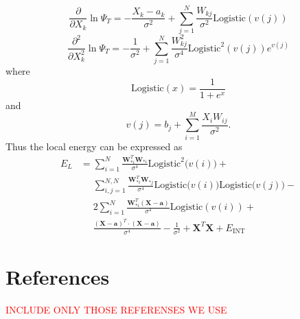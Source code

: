 \documentclass[norsk,a4paper,12pt]{article}
\begin{document}
\begin{equation}
\frac{\partial}{\partial X_k}\ln\Psi_T=-\frac{X_k-a_k}{\sigma^2}+\sum_{j=1}^{N}\frac{W_{kj}}{\sigma^2}\text{Logistic}(v(j))
\end{equation}
\begin{equation}
\frac{\partial^2}{\partial X_k^2}\ln\Psi_T=-\frac{1}{\sigma^2}+\sum_{j=1}^{N}\frac{W_{kj}^2}{\sigma^4}\text{Logistic}^2(v(j))e^{v(j)}
\end{equation}
where 
\begin{equation}
\text{Logistic}(x)=\frac{1}{1+e^x}
\end{equation}
and
\begin{equation}
v(j)=b_j+\sum_{i=1}^{M}\frac{X_iW_{ij}}{\sigma^2}.
\end{equation}
Thus the local energy can be expressed as
\begin{align}
E_L&=\sum_{i=1}^{N}\frac{\boldsymbol{W}_{*i}^T\boldsymbol{W}_{*i}}{\sigma^4}\text{Logistic}^2\big(v(i)\big)+\\
&\phantom{=}\sum_{i,j=1}^{N,N}\frac{\boldsymbol{W}_{*i}^T\boldsymbol{W}_{*j}}{\sigma^4}\text{Logistic}\big(v(i)\big)\text{Logistic}\big(v(j)\big)-\\
&\phantom{=}2\sum_{i=1}^N\frac{\boldsymbol{W}_{*i}^T(\boldsymbol{X}-\boldsymbol{a})}{\sigma^4}\text{Logistic}(v(i))+\\
&\phantom{=}\frac{(\boldsymbol{X}-\boldsymbol{a})^T\cdot(\boldsymbol{X}-\boldsymbol{a})}{\sigma^4}-\frac{1}{\sigma^2}+\boldsymbol{X}^T\boldsymbol{X}+E_{\text{INT}}
\end{align}



\newpage
\section{References}

\textcolor{red}{INCLUDE ONLY THOSE REFERENSES WE USE}
\end{document}
